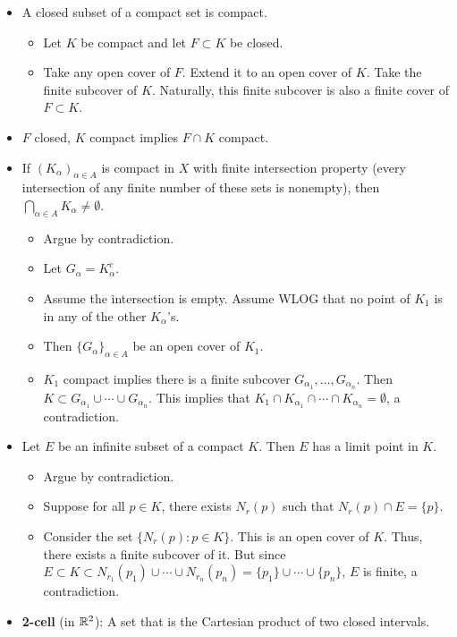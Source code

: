 \documentclass[../../notes.tex]{subfiles}
\begin{document}
\begin{itemize}
    \item A closed subset of a compact set is compact.
    \begin{itemize}
        \item Let $K$ be compact and let $F\subset K$ be closed.
        \item Take any open cover of $F$. Extend it to an open cover of $K$. Take the finite subcover of $K$. Naturally, this finite subcover is also a finite cover of $F\subset K$.
    \end{itemize}
    \item $F$ closed, $K$ compact implies $F\cap K$ compact.
    \item If $(K_\alpha)_{\alpha\in A}$ is compact in $X$ with finite intersection property (every intersection of any finite number of these sets is nonempty), then $\bigcap_{\alpha\in A}K_\alpha\neq\emptyset$.
    \begin{itemize}
        \item Argue by contradiction.
        \item Let $G_\alpha=K_\alpha^c$.
        \item Assume the intersection is empty. Assume WLOG that no point of $K_1$ is in any of the other $K_\alpha$'s.
        \item Then $\{G_\alpha\}_{\alpha\in A}$ be an open cover of $K_1$.
        \item $K_1$ compact implies there is a finite subcover $G_{\alpha_1},\dots,G_{\alpha_n}$. Then $K\subset G_{\alpha_1}\cup\cdots\cup G_{\alpha_n}$. This implies that $K_1\cap K_{\alpha_1}\cap\cdots\cap K_{\alpha_n}=\emptyset$, a contradiction.
    \end{itemize}
    \item Let $E$ be an infinite subset of a compact $K$. Then $E$ has a limit point in $K$.
    \begin{itemize}
        \item Argue by contradiction.
        \item Suppose for all $p\in K$, there exists $N_r(p)$ such that $N_r(p)\cap E=\{p\}$.
        \item Consider the set $\{N_r(p):p\in K\}$. This is an open cover of $K$. Thus, there exists a finite subcover of it. But since $E\subset K\subset N_{r_1}(p_1)\cup\cdots\cup N_{r_n}(p_n)=\{p_1\}\cup\cdots\cup\{p_n\}$, $E$ is finite, a contradiction.
    \end{itemize}
    \item \textbf{2-cell} (in $\mathbb{R}^2$): A set that is the Cartesian product of two closed intervals.
    \begin{figure}[h!]
        \centering
\end{figure}
\end{itemize}
\end{document}
